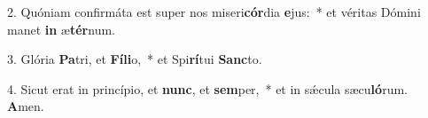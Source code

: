2. Quóniam confirmáta est super nos miseri\textbf{cór}dia \textbf{e}jus:~*  et véritas Dómini manet \textbf{in} æ\textbf{tér}num.\

3. Glória \textbf{Pa}tri, et \textbf{Fí}\textbf{li}o,~*  et Spi\textbf{rí}tui \textbf{Sanc}to.\

4. Sicut erat in princípio, et \textbf{nunc}, et \textbf{sem}per,~*  et in sǽcula sæcu\textbf{ló}rum. \textbf{A}men.\

